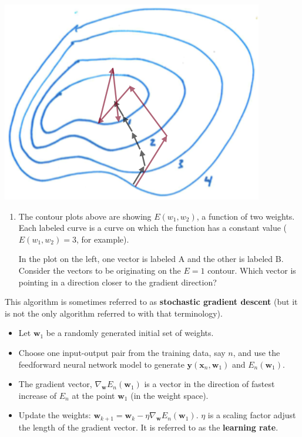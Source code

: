 \documentclass[12pt,letterpaper,noanswers]{exam}
\newcommand{\vc}[1]{\boldsymbol{#1}}
\newcommand{\note}[1]{{#1}} %
\begin{document}
\includegraphics[scale=0.5]{img/C23gradientpath.png}
\begin{enumerate}[resume=classQ]
    \item The contour plots above are showing $E(w_1,w_2)$, a function of two weights.  Each labeled curve is a curve on which the function has a constant value ($E(w_1,w_2) = 3$, for example).
   
   In the plot on the left, one vector is labeled A and the other is labeled B.  Consider the vectors to be originating on the $E = 1$ contour.  Which vector is pointing in a direction closer to the gradient direction?
    \vspace{1cm}
   
\end{enumerate}

\note{\begin{tcolorbox}
This algorithm is sometimes referred to as \textbf{stochastic gradient descent} (but it is not the only algorithm referred to with that terminology).
\begin{itemize}
\itemsep0pt
    \item Let $\vc{w}_1$ be a randomly generated initial set of weights.
    \item Choose one input-output pair from the training data, say $n$, and use the feedforward neural network model to generate $\vc{y}(\vc{x}_n,\vc{w}_1)$ and $E_ n(\vc{w}_1)$.
\item The gradient vector, $\nabla_{\vc{w}}E_n(\vc{w}_1)$ is a vector in the direction of fastest increase of $E_n$ at the point $\vc{w}_1$ (in the weight space). 
\item Update the weights: $\vc{w}_{k+1} = \vc{w}_k - \eta\nabla_{\vc{w}}E_n(\vc{w}_1)$.  $\eta$ is a scaling factor adjust the length of the gradient vector.  It is referred to as the \textbf{learning rate}.
\end{itemize}
\end{tcolorbox}}
\end{document}
